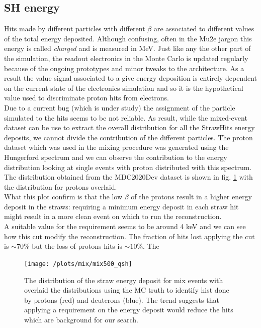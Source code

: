\documentclass[12pt,a4paper,openright, oneside, titlepage]{book} %
\begin{document}
\subsection{SH energy}
Hits made by different particles with different $\beta$ are associated to different values of the total energy deposited. 
Although confusing, often in the Mu2e jargon this energy is called \textit{charged} and is measured in MeV.
Just like any the other part of the simulation, the readout electronics in the Monte Carlo is updated regularly because of the ongoing prototypes and minor tweaks to the architecture. 
As a result the value signal associated to a give energy deposition is entirely dependent on the current state of the electronics simulation and so it is the hypothetical value used to discriminate proton hits from electrons.\\
Due to a current bug (which is under study) the assignment of the particle simulated to the hits seems to be not reliable. 
As result, while the mixed-event dataset can be use to extract the overall distribution for all the StrawHits energy deposits, we cannot divide the contribution of the different particles. 
The proton dataset which was used in the mixing procedure was generated using the Hungerford spectrum and we can observe the contribution to the energy distribution looking at single events with proton distributed with this spectrum. 
The distribution obtained from the MDC2020Dev dataset is shown in fig. \ref{_mix_proton_qsh} with the distribution for protons overlaid.\\ 
What this plot confirm is that the low $\beta$ of the protons result in a higher energy deposit in the straws: requiring a minimum energy deposit in each straw hit might result in a more clean event on which to run the reconstruction.\\
A suitable value for the requirement seems to be around 4 keV and we can see how this cut modify the reconstruction. The fraction of hits lost applying the cut is $\sim70\%$ but the loss of protons hits is $\sim10\%$. The 

\begin{figure}[!htb]
\centering
\texttt{[image: /plots/mix/mix500\_qsh]}
\caption{The distribution of the straw energy deposit for mix events with overlaid the distributions using the MC truth to identify hist done by protons (red) and deuterons (blue). 
The trend suggests that applying a requirement on the energy deposit would reduce the hits which are background for our search.}
\label{_mix_proton_qsh}
\end{figure}
\end{document}
